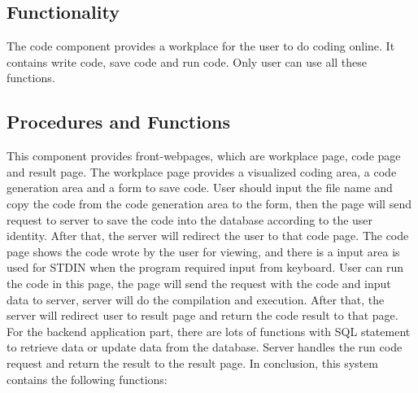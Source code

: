 \subsection{Functionality}
The code component provides a workplace for the user to do coding online. It contains write code, save code and run code. Only user can use all these functions.

\subsection{Procedures and Functions}
This component provides front-webpages, which are workplace page, code page and result page.\newline\newline
The workplace page provides a visualized coding area, a code generation area and a form to save code. User should input the file name and copy the code from the code generation area to the form, then the page will send request to server to save the code into the database according to the user identity. After that, the server will redirect the user to that code page.\newline\newline
The code page shows the code wrote by the user for viewing, and there is a input area is used for STDIN when the program required input from keyboard. User can run the code in this page, the page will send the request with the code and input data to server, server will do the compilation and execution. After that, the server will redirect user to result page and return the code result to that page.\newline\newline
For the backend application part, there are lots of functions with SQL statement to retrieve data or update data from the database. Server handles the run code request and return the result to the result page.\newline\newline
In conclusion, this system contains the following functions:\newline

